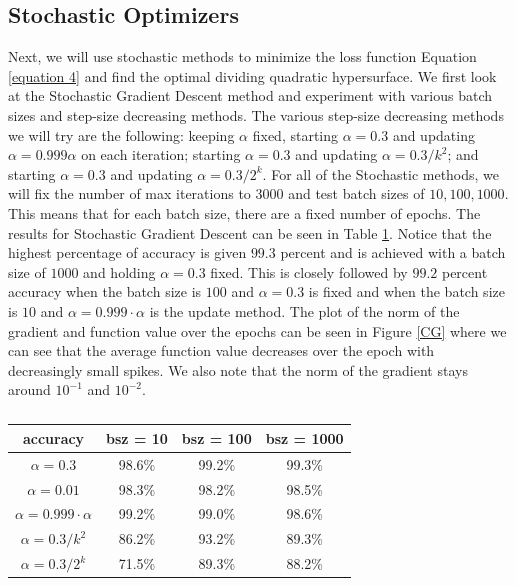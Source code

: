 \documentclass[12pt]{article}%
\begin{document}
\subsection{Stochastic Optimizers}
Next, we will use stochastic methods to minimize the loss function Equation \ref{equation 4} and find the optimal dividing quadratic hypersurface. We first look at the Stochastic Gradient Descent method and experiment with various batch sizes and step-size decreasing methods. The various step-size decreasing methods we will try are the following: keeping $\alpha$ fixed, starting $\alpha =0.3$ and updating $\alpha = 0.999\alpha$ on each iteration; starting $\alpha = 0.3$ and updating $\alpha = 0.3/k^2$; and starting $\alpha = 0.3$ and updating $\alpha = 0.3/2^k$. For all of the Stochastic methods, we will fix the number of max iterations to $3000$ and test batch sizes of $10,100,1000$. This means that for each batch size, there are a fixed number of epochs. The results for Stochastic Gradient Descent can be seen in Table \ref{CG-table}. Notice that the highest percentage of accuracy is given $99.3$ percent and is achieved with a batch size of $1000$ and holding $\alpha = 0.3$ fixed. This is closely followed by $99.2$ percent accuracy when the batch size is $100$ and $\alpha =0.3$ is fixed and when the batch size is $10$ and $\alpha = 0.999 \cdot \alpha$ is the update method. The plot of the norm of the gradient and function value over the epochs can be seen in Figure \ref{CG} where we can see that the average function value decreases over the epoch with decreasingly small spikes. We also note that the norm of the gradient stays around $10^{-1}$ and $10^{-2}$.

\begin{table}[h!]
    \centering
    \begin{tabular}{c|c|c|c}
        accuracy&  bsz = 10& bsz = 100 &  bsz = 1000  \\ \hline
        $\alpha = 0.3$&  98.6\% &  99.2\%&  99.3\%  \\
        $\alpha = 0.01$&  98.3\% &  98.2\%&  98.5\%  \\
        $\alpha = 0.999 \cdot \alpha$&  99.2\%&  99.0\%&  98.6\% \\
        $\alpha = 0.3/k^2$&  86.2\%&  93.2\%&   89.3\%\\
        $\alpha = 0.3/2^k$&  71.5\%&  89.3\%&   88.2\%\\
    \end{tabular}
    \caption{}
    \label{CG-table}
\end{table}
\end{document}
